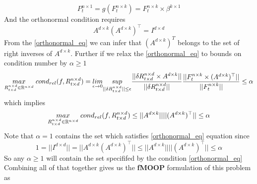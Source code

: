 \begin{equation} \label{g_for_lfm}
P^{n \times 1}_{t} = g(F^{n\times k}_t) = F^{n\times k}_t \times \beta^{k \times 1}
\end{equation}
\newline
And the orthonormal condition requires
\begin{equation} \label{orthonormal_eq}
 A^{d\times k}(A^{d\times k})^{\top} = I^{d\times d}
\end{equation}
\newline
From the \ref{orthonormal_eq} we can infer that $(A^{d\times k})^T$ belongs to the set of right inverses of $A^{d\times k}$. \newline Further if we relax the \ref{orthonormal_eq} to bounds on condition number by $\alpha \ge 1$
\begin{equation}
    \underset{R^{n\times d}_{t\times d} \in \mathbb{R}^{n\times d}}{max}\hspace{1mm} cond_{rel}(f,R^{n\times d}_{t\times d}) = \underset{\epsilon \to 0}{lim}\underset{||\delta R^{n\times d}_{t\times d}||\le \epsilon}{sup} \frac{||\delta R^{n\times d}_{t\times d}\times A^{d\times k}||}{||\delta R^{n\times d}_{t\times d}||}  \frac{||F^{n\times k}_t \times (A^{d\times k})^{\top} ||}{|| F^{n\times k}_t||}\le \alpha
\end{equation}
which implies\newline
\begin{equation}
    \underset{R^{n\times d}_{t\times d} \in \mathbb{R}^{n\times d}}{max}\hspace{1mm} cond_{rel}(f,R^{n\times d}_{t\times d}) \le ||A^{d\times k}|| ||(A^{d\times k})^{\top} ||\le \alpha
\end{equation}
\newline
Note that $\alpha=1$ contains the set which satisfies \ref{orthonormal_eq} equation since 
\begin{equation}
1= || I^{d\times d}||= || A^{d\times k}(A^{d\times k})^{\top} ||  \le || A^{d\times k}||||(A^{d\times k})^{\top} || \le \alpha
\end{equation}\newline
So any $\alpha \ge 1$ will contain the set specififed by the condition \ref{orthonormal_eq}\newline
Combining all of that together gives us the \textbf{fMOOP} formulation of this problem as

